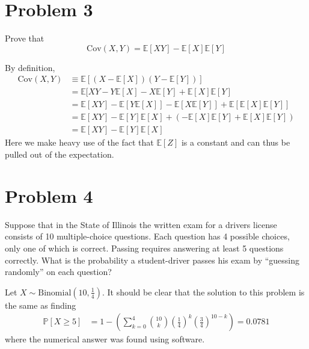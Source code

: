 \documentclass[11pt]{article}
\newcommand{\Cov}{\text{Cov}}
\newcommand{\bbE}{\mathbb{E}}
\newcommand{\bbP}{\mathbb{P}}
\begin{document}
\section*{Problem 3}
\begin{problem}
    Prove that 
    \[\Cov(X,Y) = \bbE[XY] - \bbE[X]\bbE[Y]\]
\end{problem}
\begin{solution}
    By definition,
    \begin{align*}
        \Cov(X,Y) &\equiv \bbE[(X - \bbE[X])(Y - \bbE[Y])]\\
        &= \bbE[XY - Y\bbE[X] - X\bbE[Y] + \bbE[X]\bbE[Y]\\
        &= \bbE[XY] - \bbE[Y \bbE[X]] - \bbE[X \bbE[Y]] + \bbE[\bbE[X]\bbE[Y]]\\
        &= \bbE[XY] - \bbE[Y]\bbE[X] + (-\bbE[X]\bbE[Y] + \bbE[X]\bbE[Y])\\
        &= \bbE[XY] - \bbE[Y]\bbE[X]
    \end{align*}
    Here we make heavy use of the fact that $\bbE[Z]$ is a constant and can thus be pulled out of the expectation.
\end{solution}

\newpage
\section*{Problem 4}
\begin{problem}
    Suppose that in the State of Illinois the written exam for a drivers license consists of 10 multiple-choice
 questions. Each question has 4 possible choices, only one of which is correct. Passing requires answering
 at least 5 questions correctly. What is the probability a student-driver passes his exam by “guessing
 randomly” on each question?
\end{problem}
\begin{solution}
    Let $X \sim \text{Binomial}(10, \frac{1}{4}).$ It should be clear that the solution to this problem is the same as finding 
\begin{align*}
    \bbP[X \geq 5] &= 1 - (\sum_{k=0}^4 \binom{10}{k}(\frac{1}{4})^k(\frac{3}{4})^{10-k}) = \boxed{0.0781}
\end{align*}
where the numerical answer was found using software.

\end{solution}

\newpage
\end{document}
